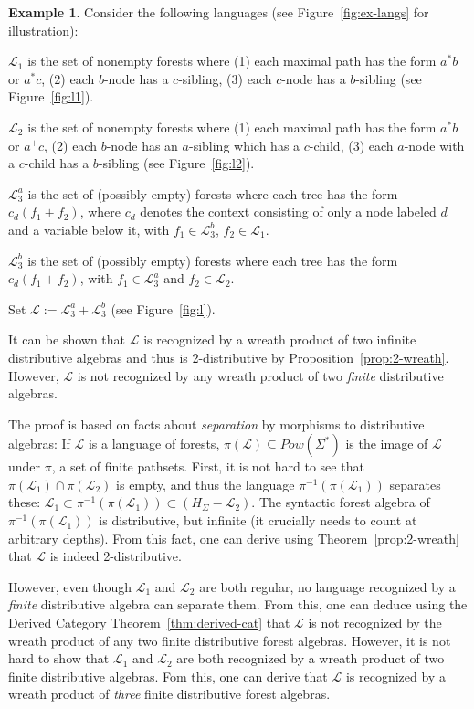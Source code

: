 \documentclass[sigplan,9pt]{acmart}\settopmatter{printfolios=true,printccs=false,printacmref=false}
\newcounter{thm}
\newcounter{theorem}
\theoremstyle{definition}
\newtheorem{example}[thm]{Example}
\newcommand{\La}[0]{{\mathcal{L}}}
\begin{document}
\begin{example}\label{ex:langs}
Consider the following languages (see Figure~\ref{fig:ex-langs} for illustration):

$\La_1$ is the set of nonempty forests where (1) each maximal path has the form $a^* b$ or $a^* c$, (2) each $b$-node has a $c$-sibling, (3) each $c$-node has a $b$-sibling (see Figure~\ref{fig:l1}).

$\La_2$ is the set of nonempty forests where (1) each maximal path has the form $a^* b$ or $a^+ c$, (2) each $b$-node has an $a$-sibling which has a $c$-child, (3) each $a$-node with a $c$-child has a $b$-sibling (see Figure~\ref{fig:l2}).

$\La^a_3$ is the set of (possibly empty) forests where each tree has the form $c_d(f_1 + f_2)$, where $c_d$ denotes the context consisting of only a node labeled $d$ and a variable below it, with $f_1 \in \La^b_3$, $f_2\in \La_1$.

$\La^b_3$ is the set of (possibly empty) forests where each tree has the form $c_d(f_1+f_2)$, with $f_1 \in \La^a_3$ and $f_2 \in \La_2$.

Set $\La := \La^a_3 + \La^b_3$  (see Figure~\ref{fig:l}).

It can be shown that $\La$ is recognized by a wreath product of two infinite distributive algebras and thus is 2-distributive by Proposition~\ref{prop:2-wreath}.
However, $\La$ is not recognized by any wreath product of two \emph{finite} distributive algebras.

The proof is based on facts about \emph{separation} by morphisms to distributive algebras:
If $\La$ is a language of forests, $\pi(\La) \subseteq Pow(\Sigma^*)$ is the image of $\La$ under $\pi$, a set of finite pathsets.
First, it is not hard to see that $\pi(\La_1) \cap \pi(\La_2)$ is empty, and thus the language $\pi^{-1}(\pi(\La_1))$ separates these: $\La_1 \subset \pi^{-1}(\pi(\La_1)) \subset (H_\Sigma - \La_2)$.
The syntactic forest algebra of $\pi^{-1}(\pi(\La_1))$ is distributive, but infinite (it crucially needs to count at arbitrary depths).
From this fact, one can derive using Theorem~\ref{prop:2-wreath} that $\La$ is indeed 2-distributive.


However, even though $\La_1$ and $\La_2$ are both regular, no language recognized by a \emph{finite} distributive algebra can separate them.
From this, one can deduce using the Derived Category Theorem~\ref{thm:derived-cat}  that $\La$ is not recognized by the wreath product of any two finite distributive forest algebras. %
However, it is not hard to show that $\La_1$ and $\La_2$ are both recognized by a wreath product of two finite distributive algebras. Fom this, one can derive that $\La$ is recognized by a wreath product of \emph{three} finite distributive forest algebras.
\end{example}
\end{document}
